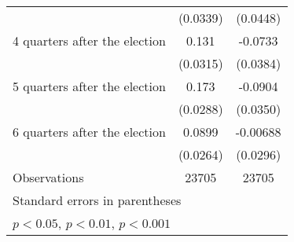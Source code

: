 \begin{table}[htbp]
\begin{tabular}{l*{2}{c}}
                    &    (0.0339)         &    (0.0448)         \\
[1em]
 4 quarters after the election&       0.131\sym{***}&     -0.0733         \\
                    &    (0.0315)         &    (0.0384)         \\
[1em]
 5 quarters after the election&       0.173\sym{***}&     -0.0904\sym{**} \\
                    &    (0.0288)         &    (0.0350)         \\
[1em]
 6 quarters after the election&      0.0899\sym{***}&    -0.00688         \\
                    &    (0.0264)         &    (0.0296)         \\
\hline
Observations        &       23705         &       23705         \\
\hline\hline
\multicolumn{3}{l}{\footnotesize Standard errors in parentheses}\\
\multicolumn{3}{l}{\footnotesize \sym{*} \(p<0.05\), \sym{**} \(p<0.01\), \sym{***} \(p<0.001\)}\\
\end{tabular}
\end{table}
